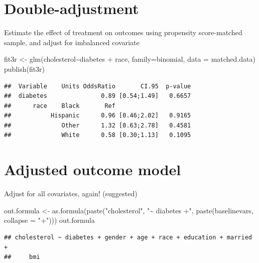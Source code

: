 \documentclass[
]{book}
\newenvironment{Shaded}{\begin{snugshade}}{\end{snugshade}}
\newcommand{\AttributeTok}[1]{\textcolor[rgb]{0.77,0.63,0.00}{#1}}
\newcommand{\FunctionTok}[1]{\textcolor[rgb]{0.00,0.00,0.00}{#1}}
\newcommand{\NormalTok}[1]{#1}
\newcommand{\OtherTok}[1]{\textcolor[rgb]{0.56,0.35,0.01}{#1}}
\newcommand{\SpecialCharTok}[1]{\textcolor[rgb]{0.00,0.00,0.00}{#1}}
\newcommand{\StringTok}[1]{\textcolor[rgb]{0.31,0.60,0.02}{#1}}
\begin{document}
\hypertarget{double-adjustment}{%
\section{Double-adjustment}\label{double-adjustment}}

Estimate the effect of treatment on outcomes using propensity score-matched sample, and adjust for imbalanced covariate

\begin{Shaded}
\begin{Highlighting}[]
\NormalTok{fit3r }\OtherTok{\textless{}{-}} \FunctionTok{glm}\NormalTok{(cholesterol}\SpecialCharTok{\textasciitilde{}}\NormalTok{diabetes }\SpecialCharTok{+}\NormalTok{ race,}
            \AttributeTok{family=}\NormalTok{binomial, }\AttributeTok{data =}\NormalTok{ matched.data)}
\FunctionTok{publish}\NormalTok{(fit3r)}
\end{Highlighting}
\end{Shaded}

\begin{verbatim}
##  Variable    Units OddsRatio       CI.95  p-value 
##  diabetes               0.89 [0.54;1.49]   0.6657 
##      race    Black       Ref                      
##           Hispanic      0.96 [0.46;2.02]   0.9165 
##              Other      1.32 [0.63;2.78]   0.4581 
##              White      0.58 [0.30;1.13]   0.1095
\end{verbatim}

\hypertarget{adjusted-outcome-model}{%
\section{Adjusted outcome model}\label{adjusted-outcome-model}}

Adjust for all covariates, again! (suggested)

\begin{Shaded}
\begin{Highlighting}[]
\NormalTok{out.formula }\OtherTok{\textless{}{-}} \FunctionTok{as.formula}\NormalTok{(}\FunctionTok{paste}\NormalTok{(}\StringTok{"cholesterol"}\NormalTok{, }\StringTok{"\textasciitilde{} diabetes +"}\NormalTok{, }
                               \FunctionTok{paste}\NormalTok{(baselinevars, }
                                     \AttributeTok{collapse =} \StringTok{"+"}\NormalTok{)))}
\NormalTok{out.formula}
\end{Highlighting}
\end{Shaded}

\begin{verbatim}
## cholesterol ~ diabetes + gender + age + race + education + married + 
##     bmi
\end{verbatim}
\end{document}
